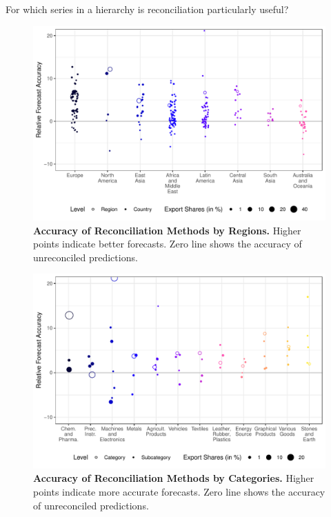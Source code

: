 \documentclass[a4paper,fleqn,11pt]{article}
\begin{document}
For which series in a hierarchy is reconciliation particularly useful?
 \begin{figure}[H]
	\includegraphics[width=\textwidth]{fig/fig_eval_regions}
	\caption[Accuracy of Reconciliation Methods by Regions]{\textbf{Accuracy of Reconciliation Methods by Regions.} Higher points indicate better forecasts. Zero line shows the accuracy of unreconciled predictions.}\label{fig:regions}
\end{figure}

 \begin{figure}[H]
	\includegraphics[width=\textwidth]{fig/fig_eval_categories}
	\caption[Accuracy of Reconciliation Methods by Categories]{\textbf{Accuracy of Reconciliation Methods by Categories.} Higher points indicate more accurate forecasts. Zero line shows the accuracy of unreconciled predictions.}\label{fig:categories}
\end{figure}
 
\end{document}
